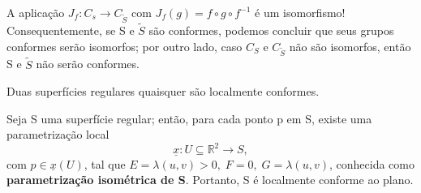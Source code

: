 \documentclass[../differential_geometry.tex]{subfiles}
\begin{document}
A aplicação \(J_{f}:C_{s}\rightarrow C_{\tilde{S}}\) com \(J_{f}(g) = f\circ g\circ f^{-1}\) é um isomorfismo! Consequentemente, se S e \(\tilde{S}\) são conformes, podemos concluir que seus grupos conformes serão isomorfos; por outro lado, caso \(C_S\) e \(C_{\tilde{S}}\) não são isomorfos, então S e \(\tilde{S}\) não serão conformes.
\begin{theorem*}
	Duas superfícies regulares quaisquer são localmente conformes.
\end{theorem*}
\begin{proof*}
	Seja S uma superfície regular; então, para cada ponto p em S, existe uma parametrização local
	\[
		\underline{x}:U\subseteq \mathbb{R}^{2}\rightarrow S,
	\]
	com \(p\in \underline{x}(U)\), tal que \(E = \lambda (u, v) > 0,\; F=0,\; G = \lambda (u,v)\), conhecida como \textbf{parametrização isométrica de S}.
	Portanto, S é localmente conforme ao plano. \qedsymbol
\end{proof*}
\end{document}
